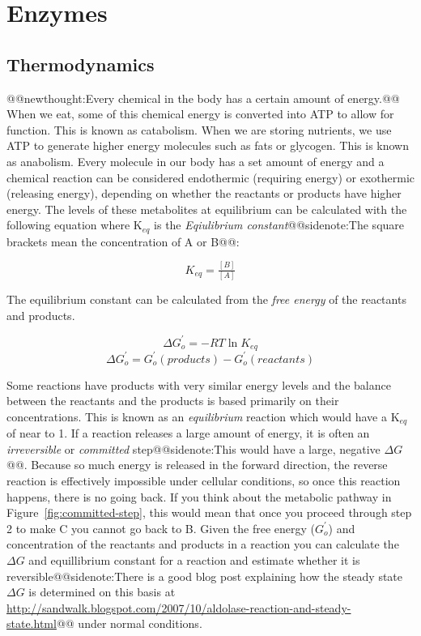 \documentclass{tufte-handout}
\makeatletter
\def\newthought#1{@@newthought:#1@@}
\def\sidenote#1{@@sidenote:#1@@}
\makeatother
\begin{document}
\section{Enzymes}

\subsection{Thermodynamics}

\newthought{Every chemical in the body has a certain amount of energy.}  When we eat, some of this chemical energy is converted into ATP to allow for function.  This is known as catabolism.  When we are storing nutrients, we use ATP to generate higher energy molecules such as fats or glycogen.  This is known as anabolism.  Every molecule in our body has a set amount of energy and a chemical reaction can be considered endothermic (requiring energy) or exothermic (releasing energy), depending on whether the reactants or products have higher energy.  The levels of these metabolites at equilibrium can be calculated with the following equation where K$_{eq}$ is the \emph{Eqiulibrium constant}\sidenote{The square brackets mean the concentration of A or B}:

\begin{equation}
K_{eq}=\tfrac{[B]}{[A]}
\end{equation}

 The equilibrium constant can be calculated from the \emph{free energy} of the reactants and products.

\begin{equation}
\Delta G^{'}_{o} = - R T \ln K_{eq}
\end{equation}
\begin{equation}
\Delta G^{'}_{o} = G^{'}_{o} (products) - G^{'}_{o} (reactants)
 \end{equation}


Some reactions have products with very similar energy levels and the balance between the reactants and the products is based primarily on their concentrations.  This is known as an \emph{equilibrium} reaction which would have a K$_{eq}$ of near to 1.  If a reaction releases a large amount of energy, it is often an \emph{irreversible} or \emph{committed} step\sidenote{This would have a large, negative $\Delta G$}.  Because so much energy is released in the forward direction, the reverse reaction is effectively impossible under cellular conditions, so once this reaction happens, there is no going back.  If you think about the metabolic pathway in Figure~\ref{fig:committed-step}, this would mean that once you proceed through step 2 to make  C you cannot go back to B.  Given the free energy ($G^{'}_{o}$) and concentration of the reactants and products in a reaction you can calculate the $\Delta G$ and equillibrium constant for a reaction and estimate whether it is reversible\sidenote{There is a good blog post explaining how the steady state $\Delta G$ is determined on this basis at \url{http://sandwalk.blogspot.com/2007/10/aldolase-reaction-and-steady-state.html}} under normal conditions.
\end{document}
